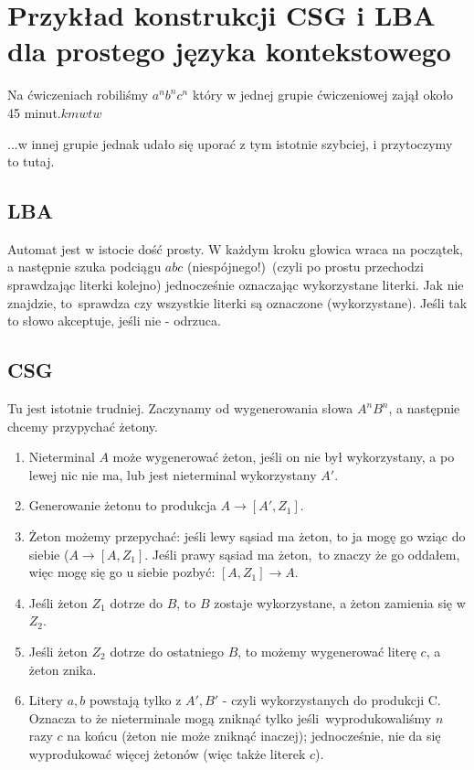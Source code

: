 \section{Przykład konstrukcji CSG i LBA dla prostego języka kontekstowego}

Na ćwiczeniach robiliśmy \( a^nb^nc^n\) który w jednej grupie ćwiczeniowej zajął około 45 minut.\( kmwtw\)

...w innej grupie jednak udało się uporać z tym istotnie szybciej, i przytoczymy to tutaj.

\subsection{LBA}

Automat jest w istocie dość prosty. W każdym kroku głowica wraca na początek, a następnie szuka podciągu \(abc\) (niespójnego!)\
(czyli po prostu przechodzi sprawdzając literki kolejno) jednocześnie oznaczając wykorzystane literki. Jak nie znajdzie, to\
sprawdza czy wszystkie literki są oznaczone (wykorzystane). Jeśli tak to słowo akceptuje, jeśli nie - odrzuca.

\subsection{CSG}

Tu jest istotnie trudniej. Zaczynamy od wygenerowania słowa \(A^nB^n\), a następnie chcemy przypychać żetony.

\begin{enumerate}
    \item Nieterminal \(A\) może wygenerować żeton, jeśli on nie był wykorzystany, a po lewej nic nie ma, lub jest nieterminal wykorzystany \(A'\).
    \item Generowanie żetonu to produkcja \(A \rightarrow [A', Z_1]\).
    \item Żeton możemy przepychać: jeśli lewy sąsiad ma żeton, to ja mogę go wziąc do siebie (\(A \rightarrow [A, Z_1]\)\). Jeśli prawy sąsiad ma żeton,\
    to znaczy że go oddałem, więc mogę się go u siebie pozbyć: \([A, Z_1] \rightarrow A\).
    \item Jeśli żeton \(Z_1\) dotrze do \(B\), to \(B\) zostaje wykorzystane, a żeton zamienia się w \(Z_2\).
    \item Jeśli żeton \(Z_2\) dotrze do ostatniego \(B\), to możemy wygenerować literę \(c\), a żeton znika.
    \item Litery \(a, b\) powstają tylko z \(A', B'\) - czyli wykorzystanych do produkcji C. Oznacza to że nieterminale mogą zniknąć tylko jeśli\
    wyprodukowaliśmy \(n\) razy \(c\) na końcu (żeton nie może zniknąć inaczej); jednocześnie, nie da się wyprodukować więcej żetonów (więc także literek \(c\)).
\end{enumerate}